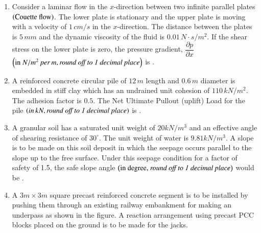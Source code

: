 \documentclass[journal,12pt,onecolumn]{IEEEtran}
\theoremstyle{remark}
\begin{document}
\begin{enumerate}
\hfill{}

\item Consider a laminar flow in the $x$-direction between two infinite parallel plates $\left(\text{Couette flow}\right)$. The lower plate is stationary and the upper plate is moving with a velocity of $1 \, cm/s$ in the $x$-direction. The distance between the plates is $5 \, mm$ and the dynamic viscosity of the fluid is $0.01 \, N \cdot s/m^2$. If the shear stress on the lower plate is zero, the pressure gradient, $\dfrac{\partial p}{\partial x}$ $\left(\text{in }N/m^2 \, per \, m, \textit{round off to 1 decimal place}\right)$ is \underline{\hspace{2cm}}.

\hfill{}

\item A reinforced concrete circular pile of $12 \, m$ length and $0.6 \, m$ diameter is embedded in stiff clay which has an undrained unit cohesion of $110 \, kN/m^2$. The adhesion factor is $0.5$. The Net Ultimate Pullout (uplift) Load for the pile $\left(in \, kN, \textit{round off to 1 decimal place}\right)$ is \underline{\hspace{2cm}}.

\hfill{}

\item A granular soil has a saturated unit weight of $20 kN/m^3$ and an effective angle of shearing resistance of $30^\circ$. The unit weight of water is $9.81 kN/m^3$. A slope is to be made on this soil deposit in which the seepage occurs parallel to the slope up to the free surface. Under this seepage condition for a factor of safety of 1.5, the safe slope angle $\left(\text{in degree, }\textit{round off to 1 decimal place}\right)$ would be \underline{\hspace{2cm}}.

\hfill{}

\item A $3m \times 3m$ square precast reinforced concrete segment is to be installed by pushing them through an existing railway embankment for making an underpass as shown in the figure. A reaction arrangement using precast PCC blocks placed on the ground is to be made for the jacks.  


\end{enumerate}
\end{document}
